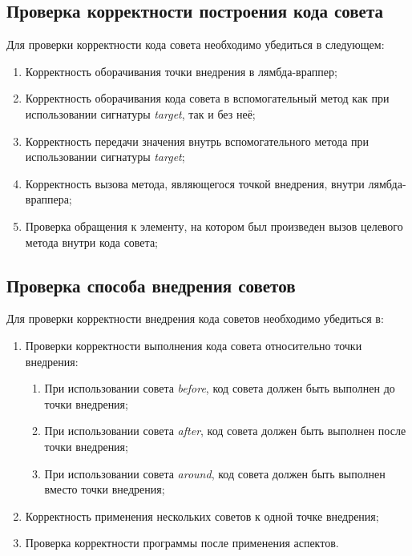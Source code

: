 \subsection{Проверка корректности построения кода совета}
\label{subs:advice_code_testing_program}
Для проверки корректности кода совета необходимо убедиться в следующем:
\begin{enumerate}
    \item \label{list:lambda_wrapper_check}Корректность оборачивания точки внедрения в лямбда-враппер;
    \item \label{list:buffer_method_check}Корректность оборачивания кода совета в вспомогательный метод как при использовании сигнатуры \textit{target}, так и без неё;
    \item \label{list:buffer_method_call_check}Корректность передачи значения внутрь вспомогательного метода при использовании сигнатуры \textit{target};
    \item \label{list:pointcut_call_check}Корректность вызова метода, являющегося точкой внедрения, внутри лямбда-враппера;
    \item \label{list:target_use_check}Проверка обращения к элементу, на котором был произведен вызов целевого метода внутри кода совета;
\end{enumerate}
\subsection{Проверка способа внедрения советов}
\label{subs:advice_weaving_testing_program}
Для проверки корректности внедрения кода советов необходимо убедиться в:
\begin{enumerate}
    \item \label{list:advice_weaving_check}Проверки корректности выполнения кода совета относительно точки внедрения:
    \begin{enumerate}
        \item \label{list:before_advice_weaving_check}При использовании совета \textit{before}, код совета должен быть выполнен до точки внедрения;
        \item \label{list:after_advice_weaving_check}При использовании совета \textit{after}, код совета должен быть выполнен после точки внедрения;
        \item \label{list:around_advice_weaving_check}При использовании совета \textit{around}, код совета должен быть выполнен вместо точки внедрения;
    \end{enumerate}
    \item \label{list:several_advices_weaving_check}Корректность применения нескольких советов к одной точке внедрения;
    \item \label{list:program_work_check}Проверка корректности программы после применения аспектов.
\end{enumerate}

